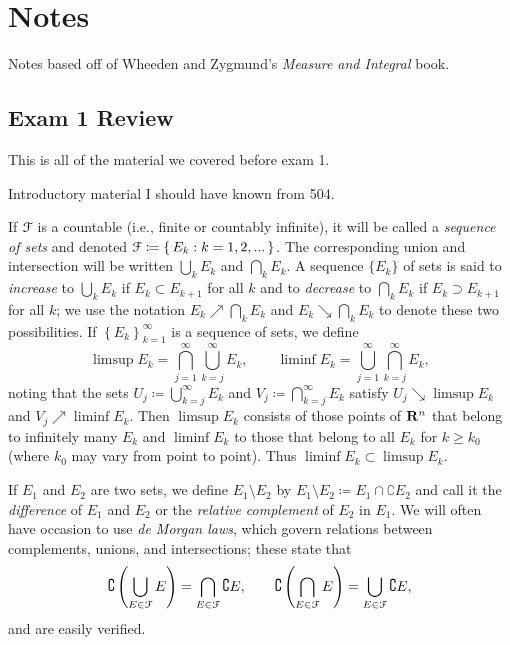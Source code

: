 \chapter{Notes}
Notes based off of Wheeden and Zygmund's \emph{Measure and Integral} book.
\section{Exam 1 Review}
This is all of the material we covered before exam 1.

\bigskip

Introductory material I should have known from 504.

If $\mathcal{F}$ is a countable (i.e., finite or countably infinite), it will be
called a \emph{sequence of sets} and denoted
$\mathcal{F}\coloneqq\left\{\,E_k:k=1,2,...\,\right\}$. The corresponding union
and intersection will be written $\bigcup_k E_k$ and $\bigcap_k E_k$. A
sequence $\{E_k\}$ of sets is said to \emph{increase} to $\bigcup_k E_k$ if
$E_k\subset E_{k+1}$ for all $k$ and to \emph{decrease} to $\bigcap_k E_k$
if $E_k\supset E_{k+1}$ for all $k$; we use the notation
$E_k\nearrow\bigcap_k E_k$ and $E_k\searrow\bigcap_k E_k$ to denote these
two possibilities. If $\left\{E_k\right\}_{k=1}^\infty$ is a sequence of
sets, we define
\begin{equation}
\label{eq:limsup-liminf-sets}
\limsup E_k=\bigcap_{j=1}^\infty\bigcup_{k=j}^\infty E_k,\qquad
\liminf E_k=\bigcup_{j=1}^\infty\bigcap_{k=j}^\infty E_k,
\end{equation}
noting that the sets $U_j\coloneqq\bigcup_{k=j}^\infty E_k$ and
$V_j\coloneqq\bigcap_{k=j}^\infty E_k$ satisfy $U_j\searrow\limsup E_k$ and
$V_j\nearrow\liminf E_k$. Then $\limsup E_k$ consists of those points of
$\mathbf{R}^n$ that belong to infinitely many $E_k$ and $\liminf E_k$ to those
that belong to all $E_k$ for $k\geq k_0$ (where $k_0$ may vary from point
to point). Thus $\liminf E_k\subset\limsup E_k$.

If $E_1$ and $E_2$ are two sets, we define $E_1\setminus E_2$ by
$E_1\setminus E_2\coloneqq E_1\cap\complement E_2$ and call it the
\emph{difference} of $E_1$ and $E_2$ or the \emph{relative complement} of
$E_2$ in $E_1$. We will often have occasion to use \emph{de Morgan laws},
which govern relations between complements, unions, and intersections;
these state that
\begin{equation}
\label{eq:de-morgan-laws}
\complement
\left(\bigcup_{E\in\mathcal{F}}E\right)=
\bigcap_{E\in\mathcal{F}}\complement E,\qquad
\complement
\left(\bigcap_{E\in\mathcal{F}}E\right)=
\bigcup_{E\in\mathcal{F}}\complement E,
\end{equation}
and are easily verified.


